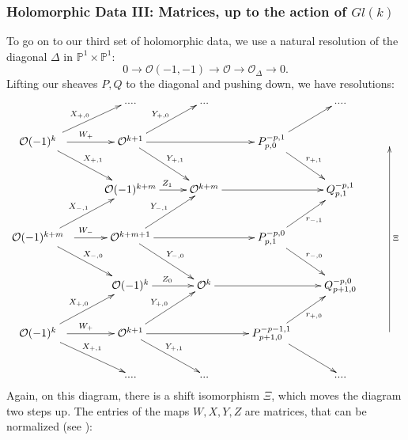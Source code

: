 \documentclass[12pt]{article}
\theoremstyle{definition}
\theoremstyle{remark}
\numberwithin{theorem}{section}
\def\bP{{\mathbb {P}}}
\def\pO{{\mathcal O}}
\begin{document}
\subsubsection{Holomorphic Data III: Matrices, up to the action of $Gl(k)$} 

To go on to our third set of holomorphic data, we use a natural resolution of the diagonal $\Delta$ in $\bP^1\times \bP^1$:
\begin{equation} \label{resolution-diagonal}
0\rightarrow \pO(-1,-1)\rightarrow \pO\rightarrow \pO_\Delta\rightarrow 0.
\end{equation}
Lifting our sheaves $P, Q$ to the diagonal and pushing down, we have resolutions:
\begin{equation} \label{resolution-PQ}\xymatrix{ &....&...& &....&\\
\pO(-1)^{k }\ \  \ar[dr]^{X_{+,1}  } \ar[r]^{W_+}\ar[ur]^{X_{+,0} }&   \pO^{k+1}\ar[dr]^{Y_{+,1}}\ar[ur]^{Y_{+,0}}\ar[rr]&   &P_{p,0}^{-p,1}\ar[dr]^{r_{+,1}}\ar[ur] &&\\  
 & \pO(-1)^{k+m} \ar[r]^{Z_1 } &\pO^{k+m}\ar[rr]& &Q_{p,1}^{-p,1}\\
 \pO(-1)^{k+m}\ \  \ar[dr]^{X_{-,0} }\ar[r]^{W_-}\ar[ur]^{X_{-,1} }& \pO^{k+m+1} \ar[dr]^{Y_{-,0} }\ar[ur]^{Y_{-,1} }\ar[rr]&& P_{p,1}^{-p,0}\ar[ur]_{r_{-,1}}\ar[dr]^{r_{-,0}} \\ 
 & \pO(-1)^{k } \ar[r]^{Z_0} &\pO^{k}\ar[rr]& &Q_{p+1,0}^{-p ,0}\\
 \pO(-1)^{k }\ \ \ar[dr]^{X_{+,1}  } \ar[r]^{W_+}\ar[ur]^{X_{+,0} }&   \pO^{k +1}\ar[dr]^{Y_{+,1}}\ar[ur]^{Y_{+,0}}\ar[rr]&   &P_{p+1,0}^{-p-1,1}\ar[dr] \ar[ur]_{r_{+,0}}&&\ar[uuuu]_{\Xi}\\
 &....&...&  &....&
}
\end{equation}
Again, on this diagram, there is a shift isomorphism $ \Xi$, which moves the diagram two steps up. The entries of the maps $W, X,Y, Z$ are  matrices, that can be normalized (see \cite{Charbonneau:2006gu}):
\bigskip
\end{document}
